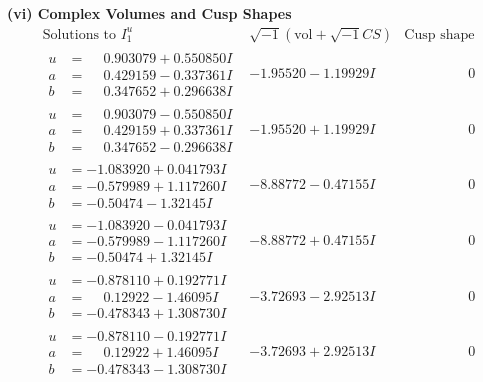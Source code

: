 \documentclass[1p]{elsarticle_modified}
\theoremstyle{definition}
\newcommand{\I}{\sqrt{-1}}
\begin{document}
\newpage\flushleft \textbf{(vi) Complex Volumes and Cusp Shapes}
$$\begin{array}{c|c|c}  
\text{Solutions to }I^u_{1}& \I (\text{vol} + \sqrt{-1}CS) & \text{Cusp shape}\\
 \hline 
\begin{aligned}
u &= \phantom{-}0.903079 + 0.550850 I \\
a &= \phantom{-}0.429159 - 0.337361 I \\
b &= \phantom{-}0.347652 + 0.296638 I\end{aligned}
 & -1.95520 - 1.19929 I & \phantom{-0.000000 } 0 \\ \hline\begin{aligned}
u &= \phantom{-}0.903079 - 0.550850 I \\
a &= \phantom{-}0.429159 + 0.337361 I \\
b &= \phantom{-}0.347652 - 0.296638 I\end{aligned}
 & -1.95520 + 1.19929 I & \phantom{-0.000000 } 0 \\ \hline\begin{aligned}
u &= -1.083920 + 0.041793 I \\
a &= -0.579989 + 1.117260 I \\
b &= -0.50474 - 1.32145 I\end{aligned}
 & -8.88772 - 0.47155 I & \phantom{-0.000000 } 0 \\ \hline\begin{aligned}
u &= -1.083920 - 0.041793 I \\
a &= -0.579989 - 1.117260 I \\
b &= -0.50474 + 1.32145 I\end{aligned}
 & -8.88772 + 0.47155 I & \phantom{-0.000000 } 0 \\ \hline\begin{aligned}
u &= -0.878110 + 0.192771 I \\
a &= \phantom{-}0.12922 - 1.46095 I \\
b &= -0.478343 + 1.308730 I\end{aligned}
 & -3.72693 - 2.92513 I & \phantom{-0.000000 } 0 \\ \hline\begin{aligned}
u &= -0.878110 - 0.192771 I \\
a &= \phantom{-}0.12922 + 1.46095 I \\
b &= -0.478343 - 1.308730 I\end{aligned}
 & -3.72693 + 2.92513 I & \phantom{-0.000000 } 0 \\ \hline\begin{aligned}

\end{aligned}
\end{array}$$
\end{document}
